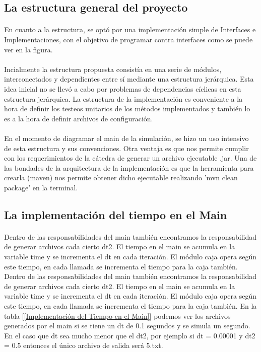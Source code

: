 \documentclass{article}
\begin{document}
\subsection{La estructura general del proyecto}

\paragraph{}
En cuanto a la estructura, se optó por una implementación simple de Interfaces e Implementaciones, con el objetivo de programar contra interfaces como se puede ver en la figura.

\paragraph{}
Incialmente la estructura propuesta consistía en una serie de módulos, interconectados y dependientes entre sí mediante una estructura jerárquica. Esta idea inicial no se llevó a cabo por problemas de dependencias cíclicas en esta estructura jerárquica. La estructura de la implementación es conveniente a la hora de definir los testeos unitarios de los métodos implementados y también lo es a la hora de definir archivos de configuración. 

\paragraph{}
En el momento de diagramar el main de la simulación, se hizo un uso intensivo de esta estructura y sus convenciones. Otra ventaja es que nos permite cumplir con los requerimientos de la cátedra de generar un archivo ejecutable .jar. Una de las bondades de la arquitectura de la implementación es que la herramienta para crearla (maven) nos permite obtener dicho ejecutable realizando 'mvn clean package' en la terminal.

\subsection{La implementación del tiempo en el Main}

\paragraph{}
Dentro de las responsabilidades del main también encontramos la responsabilidad de generar archivos cada cierto dt2. El tiempo en el main se acumula en la variable time y se incrementa el dt en cada iteración. El módulo caja opera según este tiempo, en cada llamada se incrementa el tiempo para la caja también. Dentro de las responsabilidades del main también encontramos la responsabilidad de generar archivos cada cierto dt2. El tiempo en el main se acumula en la variable time y se incrementa el dt en cada iteración. El módulo caja opera según este tiempo, en cada llamada se incrementa el tiempo para la caja también. En la tabla [\ref{Implementación del Tiempo en el Main}] podemos ver los archivos generados por el main si se tiene un dt de 0.1 segundos y se simula un segundo. En el caso que dt sea mucho  menor que el dt2, por ejemplo si dt = 0.00001 y dt2 = 0.5 entonces el único archivo de salida será 5.txt.
\end{document}
